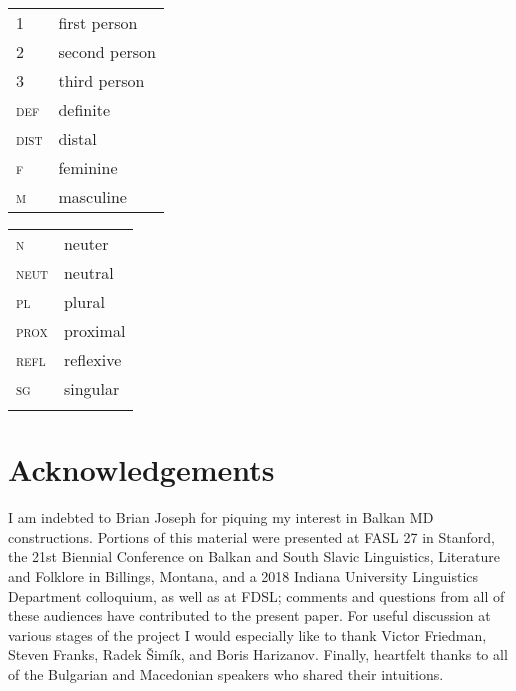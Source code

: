 \documentclass[output=paper,
colorlinks,
citecolor=brown,
newtxmath
]{langscibook}
\begin{document}
\begin{tabularx}{.5\textwidth}{@{}lX@{}}
\textsc{1}&first person\\
\textsc{2}&second person\\
\textsc{3}&third person\\
\textsc{def}&{definite}\\
\textsc{dist}&distal\\
\textsc{f}&feminine\\
\textsc{m}&masculine\\
\end{tabularx}%
\begin{tabularx}{.5\textwidth}{@{}lX@{}}
\textsc{n}&neuter\\
\textsc{neut}&neutral\\
\textsc{pl}&plural\\
\textsc{prox}&proximal\\
\textsc{refl}&reflexive\\
\textsc{sg}&singular\\
&\\
\end{tabularx}

\section*{Acknowledgements}
I am indebted to Brian Joseph for piquing my interest in Balkan MD constructions. Portions of this material were presented at FASL 27 in Stanford, the 21st Biennial Conference on Balkan and South Slavic Linguistics, Literature and Folklore in Billings, Montana, and a 2018 Indiana University Linguistics Department colloquium, as well as at FDSL; comments and questions from all of these audiences have contributed to the present paper. For useful discussion at various stages of the project I would especially like to thank Victor Friedman, Steven Franks, Radek Šimík, and Boris Harizanov. Finally, heartfelt thanks to all of the Bulgarian and Macedonian speakers who shared their intuitions.

\sloppy
\printbibliography[heading=subbibliography,notkeyword=this]
\end{document}

